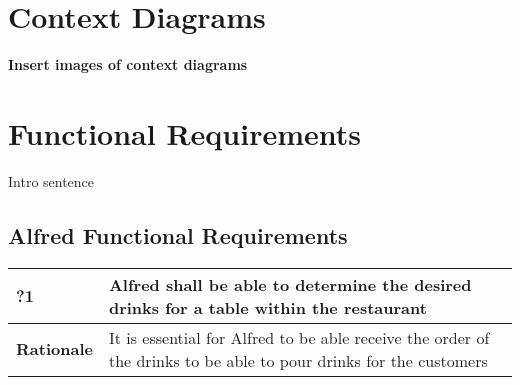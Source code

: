 \documentclass [11pt]{article}
\begin{document}
\section{Context Diagrams}
\textbf{Insert images of context diagrams}



\section {Functional Requirements} 
Intro sentence






\subsection{Alfred Functional Requirements}

\begin{longtable}{| p{ } | p{ } | }\hline 
\rowcolor{tableCell}\textbf{?1} & Alfred shall be able to determine the desired drinks for a table within the restaurant \\ \hline
\textbf{Rationale} & It is essential for Alfred to be able receive the order of the drinks to be able to pour drinks for the customers\\ \hline 
\end{longtable}
\end{document}

